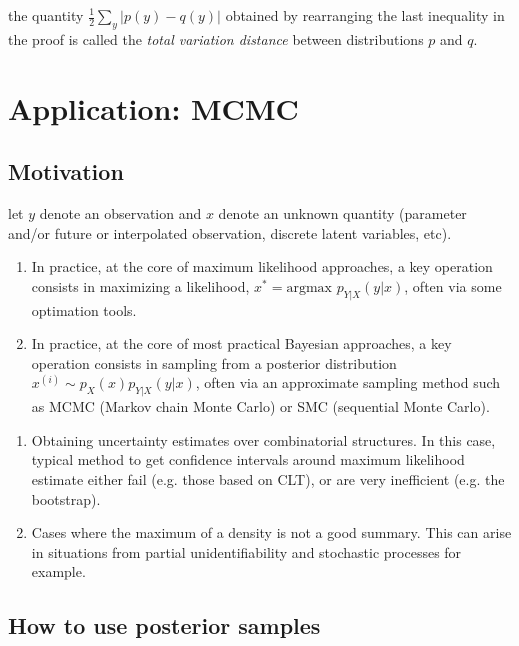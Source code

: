 \documentclass{article}
\begin{document}
 the quantity $\frac{1}{2} \sum_y | p(y) - q(y) |$ obtained by rearranging the last inequality in the proof is called the \emph{total variation distance} between distributions $p$ and $q$.


\section{Application: MCMC}

\subsection{Motivation}

 let $y$ denote an observation and $x$ denote an unknown quantity (parameter and/or future or interpolated observation, discrete latent variables, etc). 

\begin{enumerate}
  \item In practice, at the core of maximum likelihood approaches, a key operation consists in maximizing a likelihood, $x^* = \text{argmax } p_{Y|X}(y|x)$, often via some optimation tools.
  \item In practice, at the core of most practical Bayesian approaches, a key operation consists in sampling from a posterior distribution $x^{(i)} \sim p_X(x) p_{Y|X}(y|x)$, often via an approximate sampling method such as MCMC (Markov chain Monte Carlo) or SMC (sequential Monte Carlo).
\end{enumerate}

\begin{enumerate}
  \item Obtaining uncertainty estimates over combinatorial structures. In this case, typical method to get confidence intervals around maximum likelihood estimate either fail (e.g. those based on CLT), or are very inefficient (e.g. the bootstrap).
  \item Cases where the maximum of a density is not a good summary. This can arise in situations from partial unidentifiability and stochastic processes for example.
\end{enumerate}


\subsection{How to use posterior samples}
\end{document}
